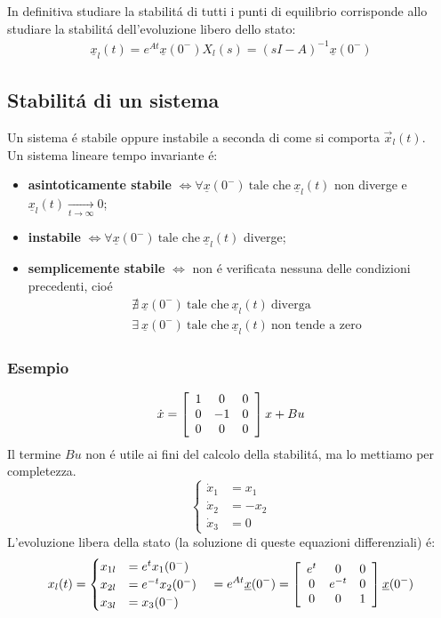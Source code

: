 \documentclass[../main.tex]{subfiles}
\begin{document}
		In definitiva studiare la stabilit\'a di tutti i punti di equilibrio corrisponde allo studiare la stabilit\'a dell'evoluzione libero dello stato:
		\begin{align*}
			\underline x_l(t) = e^{At} \underline x(0^-)
			X_l(s) = (sI-A)^{-1} \underline x(0^-)
		\end{align*}
		
	\subsection{Stabilit\'a di un sistema}
		Un sistema \'e stabile oppure instabile a seconda di come si comporta $ \vec x_l(t) $.\\
		Un sistema lineare tempo invariante \'e:
		\begin{itemize}
			\item
				\textbf{asintoticamente stabile} $ \Leftrightarrow  \forall \underline x(0^-)\ \text{tale che}\ \underline x_l(t) $ non diverge e $ \underline x_l(t) \xrightarrow[t \rightarrow \infty]{} 0 $;
			\item
				\textbf{instabile} $ \Leftrightarrow  \forall \underline x(0^-)\ \text{tale che}\ \underline x_l(t) $ diverge;
			\item
				\textbf{semplicemente stabile} $ \Leftrightarrow $ non \'e verificata nessuna delle condizioni precedenti, cio\'e
				\begin{align*}
					&\nexists\ \underline x(0^-)\ \text{tale che}\ \underline x_l(t)\ \text{diverga}\\
					&\exists\ \underline x(0^-)\ \text{tale che}\ \underline x_l(t)\ \text{non tende a zero}
				\end{align*}
		\end{itemize}
	
	\subsubsection*{Esempio}
		\begin{equation*}
			\dot x = \left[ \begin{array}{ccc} 1 & 0 & 0\\ 0 & -1 & 0\\ 0 & 0 & 0 \end{array} \right] x + Bu
		\end{equation*}
		Il termine $ Bu $ non \'e utile ai fini del calcolo della stabilit\'a, ma lo mettiamo per completezza.
		\[ 
			\begin{cases}
				\dot x_1 &= x_1\\
				\dot x_2 &= -x_2\\
				\dot x_3 &= 0
			\end{cases}
		\]
		L'evoluzione libera della stato (la soluzione di queste equazioni differenziali) \'e:
		\[ 
			x_l(t) = 
			\begin{cases}
				x_{1l} &= e^t x_1(0^-)\\
				x_{2l} &= e^{-t} x_2(0^-)\\
				x_{3l} &= x_3(0^-)
			\end{cases}
			\quad = e^{At} \underline x(0^-) = \left[ \begin{array}{ccc} e^t & 0 & 0\\ 0 & e^{-t} & 0\\ 0 & 0 & 1 \end{array} \right] \underline x(0^-)
		\]
		  
\end{document}
